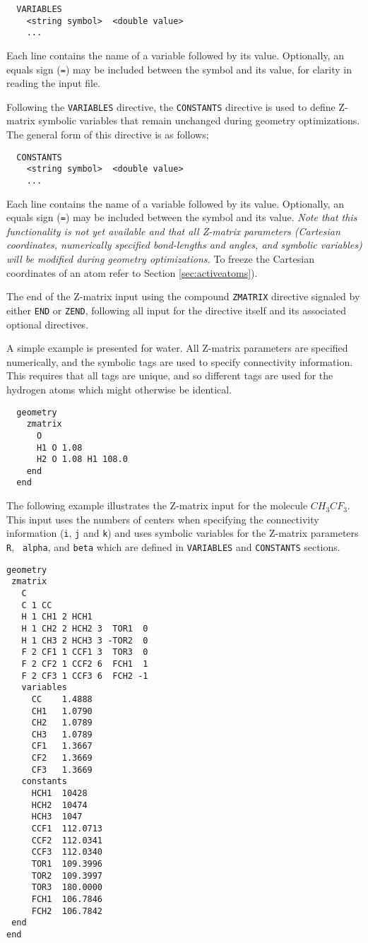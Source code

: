 \begin{verbatim}
  VARIABLES
    <string symbol>  <double value>
    ...
\end{verbatim}
Each line contains the name of a variable followed by its value.
Optionally, an equals sign (\verb+=+) may be included between the
symbol and its value, for clarity in reading the input file.

Following the \verb+VARIABLES+ directive, the \verb+CONSTANTS+
directive is used to define Z-matrix symbolic 
variables that remain unchanged during geometry optimizations.  The
general form of this directive is as follows;
\begin{verbatim}
  CONSTANTS
    <string symbol>  <double value>
    ...
\end{verbatim}
Each line contains the name of a variable followed by its value.
Optionally, an equals sign (\verb+=+) may be included between the
symbol and its value.
{\em Note that this functionality is not yet available and that all
  Z-matrix parameters (Cartesian coordinates, numerically specified
  bond-lengths and angles, and symbolic variables) will be modified
  during geometry optimizations.}  To freeze the Cartesian coordinates
of an atom refer to Section \ref{sec:activeatoms}).

The end of the Z-matrix input using the compound \verb+ZMATRIX+
directive signaled by either \verb+END+ or
\verb+ZEND+, following all input for the directive itself and its
associated optional directives.  

A simple example is presented for water.  All Z-matrix parameters are
specified numerically, and the symbolic tags are used to specify
connectivity information.  This requires that all tags are unique, and
so different tags are used for the hydrogen atoms which might 
otherwise be identical.
\begin{verbatim}
  geometry
    zmatrix 
      O
      H1 O 1.08
      H2 O 1.08 H1 108.0
    end
  end
\end{verbatim}

The following example illustrates the Z-matrix input for the molecule
$CH_3CF_3$.  This input uses the numbers of centers when specifying
the connectivity information (\verb+i+, \verb+j+ and \verb+k+) and
uses symbolic variables for the Z-matrix parameters {\tt R}, {\tt
  alpha}, and {\tt beta} which are defined in \verb+VARIABLES+ and
\verb+CONSTANTS+ sections.

\begin{verbatim}
geometry 
 zmatrix
   C 
   C 1 CC 
   H 1 CH1 2 HCH1 
   H 1 CH2 2 HCH2 3  TOR1  0 
   H 1 CH3 2 HCH3 3 -TOR2  0 
   F 2 CF1 1 CCF1 3  TOR3  0 
   F 2 CF2 1 CCF2 6  FCH1  1 
   F 2 CF3 1 CCF3 6  FCH2 -1
   variables
     CC    1.4888 
     CH1   1.0790 
     CH2   1.0789  
     CH3   1.0789  
     CF1   1.3667 
     CF2   1.3669 
     CF3   1.3669
   constants
     HCH1  10428 
     HCH2  10474 
     HCH3  1047 
     CCF1  112.0713 
     CCF2  112.0341 
     CCF3  112.0340 
     TOR1  109.3996 
     TOR2  109.3997 
     TOR3  180.0000 
     FCH1  106.7846 
     FCH2  106.7842
 end   
end
\end{verbatim}

